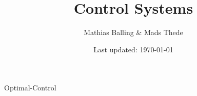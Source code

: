 \documentclass{article}
\title{Control Systems}
\author{Mathias Balling \& Mads Thede}
\date{Last updated: \today}
\begin{document}
\maketitle
\tableofcontents











 {Optimal-Control}

\end{document}
